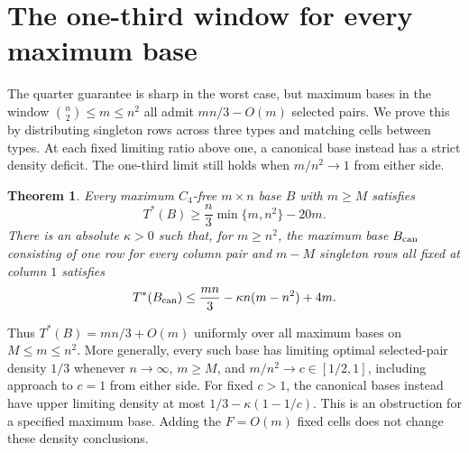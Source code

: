 \documentclass[11pt]{article}
\newtheorem{theorem}{Theorem}
\begin{document}
\section{The one-third window for every maximum base}
The quarter guarantee is sharp in the worst case, but maximum bases in
the window $\binom n2\le m\le n^2$ all admit $mn/3-O(m)$ selected pairs.
We prove this by distributing singleton rows across three types and
matching cells between types. At each fixed limiting ratio above one,
a canonical base instead has a strict density deficit. The one-third
limit still holds when $m/n^2\to1$ from either side.

\begin{theorem}\label{thm:universalpairwindow}
Every maximum $C_4$-free $m\times n$ base $B$ with $m\ge M$ satisfies
\[
 T^*(B)\ge\frac n3\min\{m,n^2\}-20m.
\]
There is an absolute $\kappa>0$ such that, for $m\ge n^2$, the maximum
base $B_{\rm can}$ consisting of one row for every column pair and
$m-M$ singleton rows all fixed at column $1$ satisfies
\[
 T^*(B_{\rm can})\le\frac{mn}{3}-\kappa n(m-n^2)+4m.
\]
\end{theorem}

Thus $T^*(B)=mn/3+O(m)$ uniformly over all maximum bases on
$M\le m\le n^2$. More generally, every such base has limiting optimal
selected-pair density $1/3$ whenever $n\to\infty$, $m\ge M$, and
$m/n^2\to c\in[1/2,1]$,
including approach to $c=1$ from either side. For fixed $c>1$, the
canonical bases instead have upper limiting density at most
$1/3-\kappa(1-1/c)$. This is an obstruction for a specified maximum base.
Adding the $F=O(m)$ fixed cells does not change these density conclusions.
\end{document}
